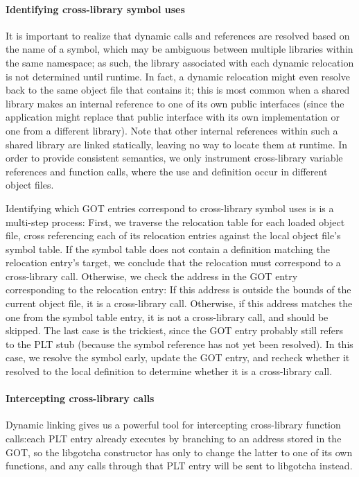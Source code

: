 \paragraph{Identifying cross-library symbol uses}

It is important to realize that dynamic calls and references are resolved based on
the name of a symbol, which may be ambiguous between multiple libraries within the
same namespace; as such, the library associated with each dynamic relocation is not
determined until runtime.  In fact, a dynamic relocation might even resolve back to
the same object file that contains it; this is most common when a shared library
makes an internal reference to one of its own public interfaces (since the
application might replace that public interface with its own implementation or one
from a different library).  Note that other internal references within such a shared
library are linked statically, leaving no way to locate them at runtime.  In order to
provide consistent semantics, we only instrument cross-library variable
references and function calls, where the use and definition occur in different object
files.

Identifying which GOT entries correspond to cross-library symbol uses
is is a multi-step process:
First, we traverse the relocation table for each loaded object file, cross
referencing each of its relocation entries against the local object file's symbol
table.  If the symbol table does not contain a definition matching the relocation
entry's target, we conclude that the relocation must correspond to a cross-library
call.  Otherwise, we check the address in the GOT entry corresponding to the
relocation entry:  If this address is outside the bounds of the current object file,
it is a cross-library call.  Otherwise, if this address matches the one from the
symbol table entry, it is not a cross-library call, and should be skipped.  The last
case is the trickiest, since the GOT entry probably still refers to the PLT stub
(because the symbol reference has not yet been resolved).  In this case, we resolve
the symbol
early, update the GOT entry, and recheck whether it resolved to the local definition
to determine whether it is a cross-library call.

\paragraph{Intercepting cross-library calls}

Dynamic linking gives us a powerful tool for intercepting cross-library function
calls:\@ each PLT entry already executes by branching to an address stored in the
GOT, so the libgotcha constructor has only to change the latter to one of its own
functions, and any calls through that PLT entry will be sent to libgotcha instead.

